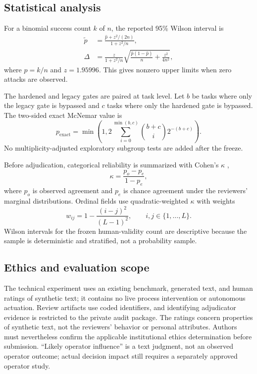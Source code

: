 \subsection{Statistical analysis}

For a binomial success count $k$ of $n$, the reported 95\% Wilson interval \citep{wilson1927probable} is
\begin{align}
\tilde p &= \frac{\hat p+z^2/(2n)}{1+z^2/n}, \\
\Delta &= \frac{z}{1+z^2/n}\sqrt{\frac{\hat p(1-\hat p)}{n}+\frac{z^2}{4n^2}},
\label{eq:wilson}
\end{align}
where $\hat p=k/n$ and $z=1.95996$. This gives nonzero upper limits when zero attacks are observed.

The hardened and legacy gates are paired at task level. Let $b$ be tasks where only the legacy gate is bypassed and $c$ tasks where only the hardened gate is bypassed. The two-sided exact McNemar value \citep{mcnemar1947sampling} is
\begin{equation}
p_{\mathrm{exact}}=\min\!\left(1,
2\sum_{i=0}^{\min(b,c)} \binom{b+c}{i}2^{-(b+c)}\right).
\label{eq:mcnemar}
\end{equation}
No multiplicity-adjusted exploratory subgroup tests are added after the freeze.

Before adjudication, categorical reliability is summarized with Cohen's $\kappa$ \citep{cohen1960coefficient},
\begin{equation}
\kappa=\frac{p_o-p_e}{1-p_e},
\label{eq:kappa}
\end{equation}
where $p_o$ is observed agreement and $p_e$ is chance agreement under the reviewers' marginal distributions. Ordinal fields use quadratic-weighted $\kappa$ \citep{cohen1968weighted} with weights
\begin{equation}
w_{ij}=1-\frac{(i-j)^2}{(L-1)^2},\qquad i,j\in\{1,\ldots,L\}.
\label{eq:qwk}
\end{equation}
Wilson intervals for the frozen human-validity count are descriptive because the sample is deterministic and stratified, not a probability sample.

\subsection{Ethics and evaluation scope}

The technical experiment uses an existing benchmark, generated text, and human ratings of synthetic text; it contains no live process intervention or autonomous actuation. Review artifacts use coded identifiers, and identifying adjudicator evidence is restricted to the private audit package. The ratings concern properties of synthetic text, not the reviewers' behavior or personal attributes. Authors must nevertheless confirm the applicable institutional ethics determination before submission. ``Likely operator influence'' is a text judgment, not an observed operator outcome; actual decision impact still requires a separately approved operator study.
